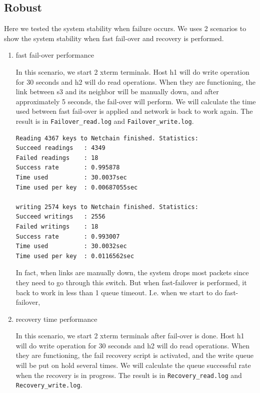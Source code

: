 \documentclass[11pt,oneside,a4paper]{article}
\begin{document}
\subsection{Robust}
Here we tested the system stability when failure occurs. We uses 2 scenarios to show the system stability when fast fail-over and recovery is performed.
\begin{enumerate}



\item fast fail-over performance

In this scenario, we start 2 xterm terminals. Host h1 will do write operation for 30 seconds and h2 will do read operations. When they are functioning, the link between s3 and its neighbor will be manually down, and after approximately 5 seconds, the fail-over will perform. We will calculate the time used between fast fail-over is applied and network is back to work again. The result is in \texttt{Failover\_read.log} and \texttt{Failover\_write.log}.

\begin{lstlisting}
Reading 4367 keys to Netchain finished. Statistics:
Succeed readings   : 4349
Failed readings    : 18
Success rate       : 0.995878
Time used          : 30.0037sec
Time used per key  : 0.00687055sec

writing 2574 keys to Netchain finished. Statistics:
Succeed writings   : 2556
Failed writings    : 18
Success rate       : 0.993007
Time used          : 30.0032sec
Time used per key  : 0.0116562sec
    \end{lstlisting}

In fact, when links are manually down, the system drops most packets since they need to go through this switch. But when fast-failover is performed, it back to work in less than 1 queue timeout. I.e. when we start to do fast-failover, 


\item recovery time performance

In this scenario, we start 2 xterm terminals after fail-over is done. Host h1 will do write operation for 30 seconds and h2 will do read operations. When they are functioning, the fail recovery script is activated, and the write queue will be put on hold several times. We will calculate the queue successful rate when the recovery is in progress. The result is in \texttt{Recovery\_read.log} and \texttt{Recovery\_write.log}.



\end{enumerate}
\end{document}
